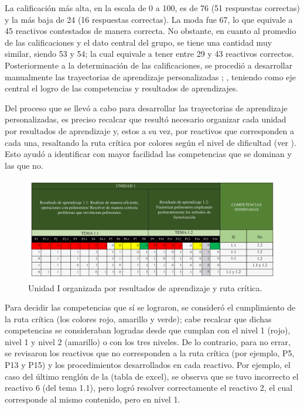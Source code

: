 \documentclass[spanish]{textolivre}
\begin{document}
La calificación más alta, en la escala de 0 a 100, es de 76 (51 respuestas correctas) y la más baja de 24 (16 respuestas correctas). La moda fue 67, lo que equivale a 45 reactivos contestados de manera correcta. No obstante, en cuanto al promedio de las calificaciones y el dato central del grupo, se tiene una cantidad muy similar, siendo 53 y 54; la cual equivale a tener entre 29 y 43 reactivos correctos. Posteriormente a la determinación de las calificaciones, se procedió a desarrollar manualmente las trayectorias de aprendizaje personalizadas ;
,
teniendo como eje central el logro de las competencias y resultados de aprendizajes. 

Del proceso que se llevó a cabo para desarrollar las trayectorias de aprendizaje personalizadas, es preciso recalcar que resultó necesario organizar cada unidad por resultados de aprendizaje y, estos a su vez, por reactivos que corresponden a cada una, resaltando la ruta crítica por colores según el nivel de dificultad (ver ). Esto ayudó a identificar con mayor facilidad las competencias que se dominan y las que no. 

\begin{figure}[h!]
   \centering
   \includegraphics[width=1\textwidth]{fig-04.pdf}
   \caption{Unidad I organizada por resultados de aprendizaje y ruta crítica.}
   \label{fig:04}
\end{figure}

Para decidir las competencias que sí se lograron, se consideró el cumplimiento de la ruta crítica (los colores rojo, amarillo y verde); cabe recalcar que dichas competencias se consideraban logradas desde que cumplan con el nivel 1 (rojo), nivel 1 y nivel 2 (amarillo) o con los tres niveles. De lo contrario, para no errar, se revisaron los reactivos que no corresponden a la ruta crítica (por ejemplo, P5, P13 y P15) y los procedimientos desarrollados en cada reactivo. Por ejemplo, el caso del último renglón de la (tabla de excel), se observa que se tuvo incorrecto el reactivo 6 (del tema 1.1), pero logró resolver correctamente el reactivo 2, el cual corresponde al mismo contenido, pero en nivel 1.
\end{document}
